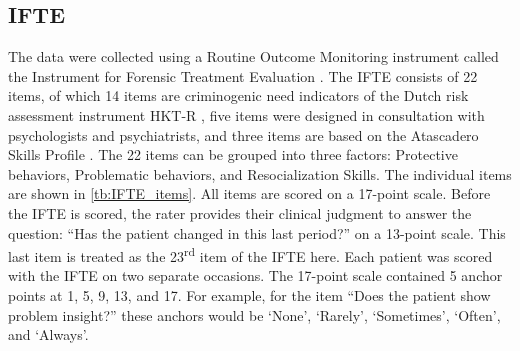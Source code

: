 \documentclass[a4paper,11pt]{article}
\newcommand{\DB}[1]{\todo[inline, color=colorDon,caption={}]{DB: {#1}}}
\begin{document}
\subsection{IFTE}
The data were collected using a Routine Outcome Monitoring instrument called the Instrument for Forensic Treatment Evaluation \parencite[IFTE;][]{schuringa2014inter, schuringa2021treatment}.
The IFTE consists of 22 items, of which 14 items are criminogenic need indicators of the Dutch risk assessment instrument HKT-R \parencite{spreen2013handleiding}, five items were designed in consultation with psychologists and psychiatrists, and three items are based on the Atascadero Skills Profile \parencite{vess2001development}.
The 22 items can be grouped into three factors: Protective behaviors, Problematic behaviors, and Resocialization Skills.
The individual items are shown in \autoref{tb:IFTE_items}.
All items are scored on a 17-point scale.
Before the IFTE is scored, the rater provides their clinical judgment to answer the question: ``Has the patient changed in this last period?'' on a 13-point scale.
This last item is treated as the 23\textsuperscript{rd} item of the IFTE here.
Each patient was scored with the IFTE on two separate occasions.
The 17-point scale contained 5 anchor points at 1, 5, 9, 13, and 17.
For example, for the item ``Does the patient show problem insight?'' these anchors would be `None', `Rarely', `Sometimes', `Often', and `Always'.

\end{document}
